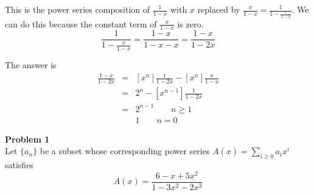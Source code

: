 \documentclass{article}
\begin{document}
This is the power series composition of $\frac{1}{1-x}$ with $x$ replaced by $\frac{x}{1-x} = \frac{1}{1 - \frac{x}{1-x}}$. We can do this because the constant term of $\frac{x}{1-x}$ is zero. $$\frac{1}{1 - \frac{x}{1-x}} = \frac{1-x}{1-x-x} = \frac{1-x}{1-2x}$$

The answer is 
\begin{eqnarray*}
	[x^n]\frac{1-x}{1-2x} &=& [x^n]\frac{1}{1-2x} - [x^n]\frac{x}{1-x}\\
	&=& 2^n - [x^{n-1}]\frac{1}{1-2x} \\
	&=& 2^{n-1} \qquad n \ge 1 \\ %
	& & 1 \qquad n=0
\end{eqnarray*}



\textbf{Problem 1}\\
Let $\{a_n\}$ be a subset whose corresponding power series $A(x) = \sum_{i \ge 0}a_ix^i$ satisfies $$A(x) = \frac{6 -x + 5x^2}{1-3x^2-2x^3}$$
\end{document}
